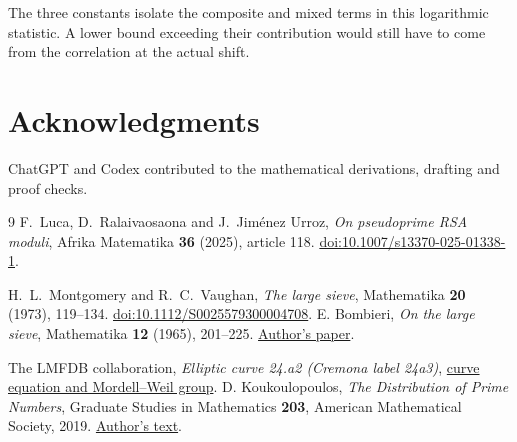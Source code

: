 \documentclass[11pt]{article}
\begin{document}
The three constants isolate the composite and mixed terms in this
logarithmic statistic. A lower bound exceeding their contribution
would still have to come from the correlation at the actual shift.

\section*{Acknowledgments}
ChatGPT and Codex contributed to the mathematical derivations,
drafting and proof checks.

\begin{thebibliography}{9}
F.~Luca, D.~Ralaivaosaona and J.~Jim\'enez Urroz,
\emph{On pseudoprime RSA moduli}, Afrika Matematika
\textbf{36} (2025), article 118.
\href{https://doi.org/10.1007/s13370-025-01338-1}{doi:10.1007/s13370-025-01338-1}.

H.~L.~Montgomery and R.~C.~Vaughan,
\emph{The large sieve}, Mathematika \textbf{20} (1973), 119--134.
\href{https://doi.org/10.1112/S0025579300004708}{doi:10.1112/S0025579300004708}.
 E. Bombieri, \emph{On the large sieve},
Mathematika \textbf{12} (1965), 201--225.
\href{https://doi.org/10.1112/S0025579300005313}{Author's paper}.

 The LMFDB collaboration, \emph{Elliptic curve 24.a2
(Cremona label 24a3)}, \href{https://www.lmfdb.org/EllipticCurve/Q/24/a/2}{curve equation and Mordell--Weil group}.
 D. Koukoulopoulos, \emph{The Distribution of Prime
Numbers}, Graduate Studies in Mathematics \textbf{203}, American
Mathematical Society, 2019. \href{https://dms.umontreal.ca/~koukoulo/documents/publications/primes.pdf}{Author's text}.
\end{thebibliography}
\end{document}
